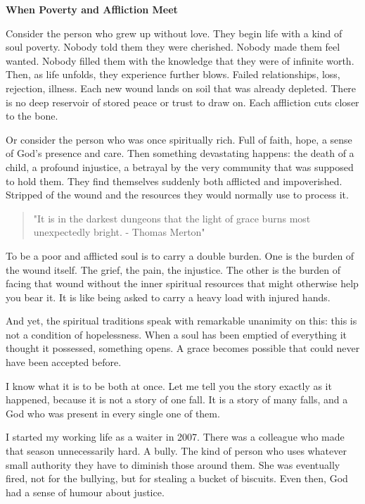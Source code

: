\textbf{When Poverty and Affliction Meet}

Consider the person who grew up without love. They begin life with a
kind of soul poverty. Nobody told them they were cherished. Nobody made
them feel wanted. Nobody filled them with the knowledge that they were
of infinite worth. Then, as life unfolds, they experience further blows.
Failed relationships, loss, rejection, illness. Each new wound lands on
soil that was already depleted. There is no deep reservoir of stored
peace or trust to draw on. Each affliction cuts closer to the bone.

Or consider the person who was once spiritually rich. Full of faith,
hope, a sense of God's presence and care. Then something devastating
happens: the death of a child, a profound injustice, a betrayal by the
very community that was supposed to hold them. They find themselves
suddenly both afflicted and impoverished. Stripped of the wound and the
resources they would normally use to process it.

\begin{quote}
"It is in the darkest dungeons that the light of grace burns most
unexpectedly bright. - Thomas Merton"
\end{quote}

To be a poor and afflicted soul is to carry a double burden. One is the
burden of the wound itself. The grief, the pain, the injustice. The
other is the burden of facing that wound without the inner spiritual
resources that might otherwise help you bear it. It is like being asked
to carry a heavy load with injured hands.

And yet, the spiritual traditions speak with remarkable unanimity on
this: this is not a condition of hopelessness. When a soul has been
emptied of everything it thought it possessed, something opens. A grace
becomes possible that could never have been accepted before.

I know what it is to be both at once. Let me tell you the story exactly
as it happened, because it is not a story of one fall. It is a story of
many falls, and a God who was present in every single one of them.

I started my working life as a waiter in 2007. There was a colleague who
made that season unnecessarily hard. A bully. The kind of person who
uses whatever small authority they have to diminish those around them.
She was eventually fired, not for the bullying, but for stealing a
bucket of biscuits. Even then, God had a sense of humour about justice.

